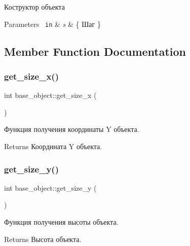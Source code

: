 Коструктор объекта 


\begin{DoxyParams}[1]{Parameters}
\mbox{\texttt{ in}}  & {\em s} & \{ Шаг \} \\
\hline
\end{DoxyParams}


\subsection{Member Function Documentation}
\mbox{\label{classbase__object_a9b018abfe21170353c163cad9511f02c}} 
\subsubsection{\texorpdfstring{get\_size\_x()}{get\_size\_x()}}
{\footnotesize\ttfamily int base\+\_\+object\+::get\+\_\+size\+\_\+x (\begin{DoxyParamCaption}{ }\end{DoxyParamCaption})}



Функция получения координаты Y объекта. 

\begin{DoxyReturn}{Returns}
Координата Y объекта. 
\end{DoxyReturn}
\mbox{\label{classbase__object_a58391e1cc3093e8b6ee1aaeadd8335d5}} 
\subsubsection{\texorpdfstring{get\_size\_y()}{get\_size\_y()}}
{\footnotesize\ttfamily int base\+\_\+object\+::get\+\_\+size\+\_\+y (\begin{DoxyParamCaption}{ }\end{DoxyParamCaption})}



Функция получения высоты объекта. 

\begin{DoxyReturn}{Returns}
Высота объекта. 
\end{DoxyReturn}
\mbox{\label{classbase__object_a53e9ce3dd05e9de706e05a5ec9df8d1e}} 
